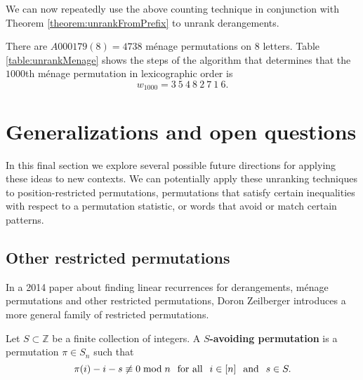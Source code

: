 We can now repeatedly use the above counting technique in conjunction with
Theorem \ref{theorem:unrankFromPrefix} to unrank derangements.

\begin{example}
  There are $A000179(8) = 4738$ m\'enage permutations on $8$ letters.
  Table \ref{table:unrankMenage} shows the steps of the algorithm that
  determines that the $1000$th m\'enage permutation in lexicographic order is
  \begin{equation}
    w_{1000} = 3 \ 5 \ 4 \ 8 \ 2 \ 7 \ 1 \ 6.
  \end{equation}
\end{example}



\section{Generalizations and open questions}

In this final section we explore several possible future directions for
applying these ideas to new contexts. We can potentially apply these unranking
techniques to position-restricted permutations, permutations that satisfy
certain inequalities with respect to a permutation statistic, or words that
avoid or match certain patterns.

%
\subsection{Other restricted permutations}
In a 2014 paper about finding linear recurrences for derangements, m\'enage
permutations and other restricted permutations, Doron Zeilberger
introduces a more general family of restricted permutations.
\begin{definition}
  Let $S \subset \mathbb Z$ be a finite collection of integers.
  A \textbf{$S$-avoiding permutation} is a permutation $\pi \in S_n$ such that
  \begin{equation}
    \pi(i) - i - s \not\equiv 0 \bmod n
    \hspace{0.25cm}\text{for all}\hspace{0.25cm}
    i \in [n]
    \hspace{0.25cm}\text{and}\hspace{0.25cm}
    s \in S.
  \end{equation}
\end{definition}

